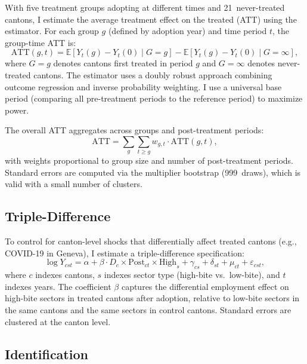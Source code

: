 \documentclass[12pt]{article}
\newcommand{\E}{\mathbb{E}}
\begin{document}
With five treatment groups adopting at different times and 21~never-treated cantons, I estimate the average treatment effect on the treated (ATT) using the \citet{callaway2021} estimator. For each group $g$ (defined by adoption year) and time period $t$, the group-time ATT is:
\begin{equation}
\text{ATT}(g,t) = \E\left[Y_t(g) - Y_t(0) \mid G = g\right] - \E\left[Y_t(g) - Y_t(0) \mid G = \infty\right],
\end{equation}
where $G = g$ denotes cantons first treated in period $g$ and $G = \infty$ denotes never-treated cantons. The estimator uses a doubly robust approach combining outcome regression and inverse probability weighting. I use a universal base period (comparing all pre-treatment periods to the reference period) to maximize power.

The overall ATT aggregates across groups and post-treatment periods:
\begin{equation}
\text{ATT} = \sum_g \sum_{t \geq g} w_{g,t} \cdot \text{ATT}(g,t),
\end{equation}
with weights proportional to group size and number of post-treatment periods. Standard errors are computed via the multiplier bootstrap (999~draws), which is valid with a small number of clusters.

\subsection{Triple-Difference}

To control for canton-level shocks that differentially affect treated cantons (e.g., COVID-19 in Geneva), I estimate a triple-difference specification:
\begin{equation}
\log Y_{cst} = \alpha + \beta \cdot D_c \times \text{Post}_{ct} \times \text{High}_s + \gamma_{cs} + \delta_{st} + \mu_{ct} + \varepsilon_{cst},
\end{equation}
where $c$ indexes cantons, $s$ indexes sector type (high-bite vs.\ low-bite), and $t$ indexes years. The coefficient $\beta$ captures the differential employment effect on high-bite sectors in treated cantons after adoption, relative to low-bite sectors in the same cantons and the same sectors in control cantons. Standard errors are clustered at the canton level.

\subsection{Identification}
\end{document}
